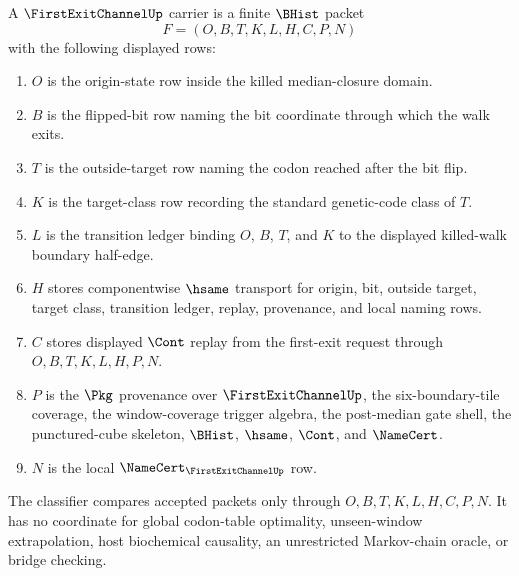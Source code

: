\begin{definition}
\label{def:first-exit-channel-carrier}
A $\FirstExitChannelUp$ carrier is a finite $\BHist$ packet
$$
F=(O,B,T,K,L,H,C,P,N)
$$
with the following displayed rows:
\begin{enumerate}
\item $O$ is the origin-state row inside the killed median-closure domain.
\item $B$ is the flipped-bit row naming the bit coordinate through which the walk exits.
\item $T$ is the outside-target row naming the codon reached after the bit flip.
\item $K$ is the target-class row recording the standard genetic-code class of $T$.
\item $L$ is the transition ledger binding $O$, $B$, $T$, and $K$ to the displayed killed-walk boundary half-edge.
\item $H$ stores componentwise $\hsame$ transport for origin, bit, outside target, target class, transition ledger, replay, provenance, and local naming rows.
\item $C$ stores displayed $\Cont$ replay from the first-exit request through $O,B,T,K,L,H,P,N$.
\item $P$ is the $\Pkg$ provenance over $\FirstExitChannelUp$, the six-boundary-tile coverage, the window-coverage trigger algebra, the post-median gate shell, the punctured-cube skeleton, $\BHist$, $\hsame$, $\Cont$, and $\NameCert$.
\item $N$ is the local $\NameCert_{\FirstExitChannelUp}$ row.
\end{enumerate}
The classifier compares accepted packets only through $O,B,T,K,L,H,C,P,N$. It has no coordinate for global codon-table optimality, unseen-window extrapolation, host biochemical causality, an unrestricted Markov-chain oracle, or bridge checking.
\end{definition}

